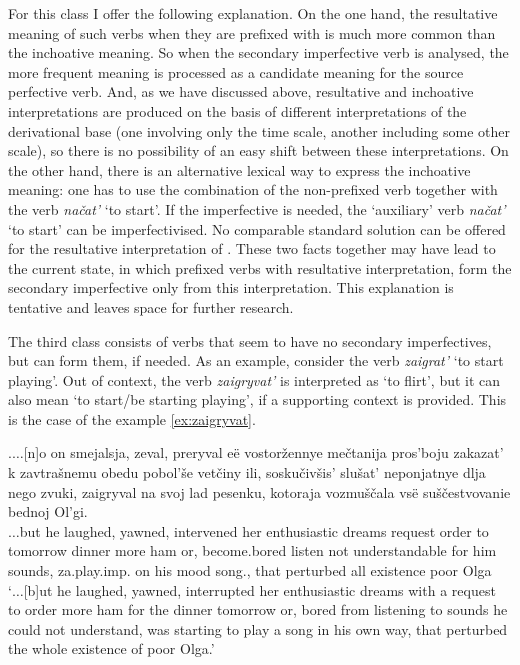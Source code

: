 For this class I offer the following explanation. On the one hand, the resultative meaning of such verbs when they are prefixed with  is much more common than the inchoative meaning. So when the secondary imperfective verb is analysed, the more frequent meaning is processed as a candidate meaning for the source perfective verb. And, as we have discussed above, resultative and inchoative interpretations are produced on the basis of different interpretations of the derivational base (one involving only the time scale, another including some other scale), so there is no possibility of an easy shift between these interpretations. On the other hand, there is an alternative lexical way to express the inchoative meaning: one has to use the combination of the non-prefixed verb together with the verb \textit{na\v{c}at'} `to start'. If the imperfective is needed, the `auxiliary' verb \textit{na\v{c}at'} `to start' can be imperfectivised. No comparable standard solution can be offered for the resultative interpretation of . These two facts together may have lead to the current state, in which prefixed verbs with resultative interpretation, form the secondary imperfective only from this interpretation. This explanation is tentative and leaves space for further research.

The third class consists of verbs that seem to have no secondary imperfectives, but can form them, if needed. As an example, consider the verb \textit{zaigrat'} `to start playing'. Out of context, the verb \textit{zaigryvat'} is interpreted as `to flirt', but it can also mean `to start/be starting playing', if a supporting context is provided. This is the case of the example \ref{ex:zaigryvat}. 

\exg.\label{ex:zaigryvat}$\ldots$[n]o on smejalsja, zeval, preryval e\"{e} vostor\v{z}ennye me\v{c}tanija pros'boju zakazat' k zavtra\v{s}nemu obedu pobol'\v{s}e vet\v{c}iny ili, sosku\v{c}iv\v{s}is' slu\v{s}at' neponjatnye dlja nego zvuki, zaigryval na svoj lad pesenku, kotoraja vozmu\v{s}\v{c}ala vs\"{e} su\v{s}\v{c}estvovanie bednoj Ol'gi.\\
$\ldots$but he laughed, yawned, intervened her enthusiastic dreams request order to tomorrow dinner more ham or, {become.bored} listen {not understandable} for him sounds, za.play.imp. on his mood song., that perturbed all existence poor Olga\\
\trans `$\ldots$[b]ut he laughed, yawned, interrupted her enthusiastic dreams with a request to order more ham for the dinner tomorrow or, bored from listening to sounds he could not understand, was starting to play a song in his own way, that perturbed the whole existence of poor Olga.'\\

